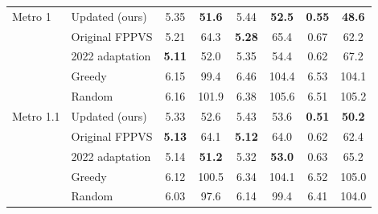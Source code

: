 \begin{tabular}{llcccccc}
\midrule
Metro 1 & Updated (ours) & 5.35 & \textbf{51.6} & 5.44 & \textbf{52.5} & \textbf{0.55} & \textbf{48.6} \\
 & Original FPPVS & 5.21 & 64.3 & \textbf{5.28} & 65.4 & 0.67 & 62.2 \\
 & 2022 adaptation & \textbf{5.11} & 52.0 & 5.35 & 54.4 & 0.62 & 67.2 \\
 & Greedy & 6.15 & 99.4 & 6.46 & 104.4 & 6.53 & 104.1 \\
 & Random & 6.16 & 101.9 & 6.38 & 105.6 & 6.51 & 105.2 \\
\midrule
Metro 1.1 & Updated (ours) & 5.33 & 52.6 & 5.43 & 53.6 & \textbf{0.51} & \textbf{50.2} \\
 & Original FPPVS & \textbf{5.13} & 64.1 & \textbf{5.12} & 64.0 & 0.62 & 62.4 \\
 & 2022 adaptation & 5.14 & \textbf{51.2} & 5.32 & \textbf{53.0} & 0.63 & 65.2 \\
 & Greedy & 6.12 & 100.5 & 6.34 & 104.1 & 6.52 & 105.0 \\
 & Random & 6.03 & 97.6 & 6.14 & 99.4 & 6.41 & 104.0 \\
\bottomrule
\end{tabular}